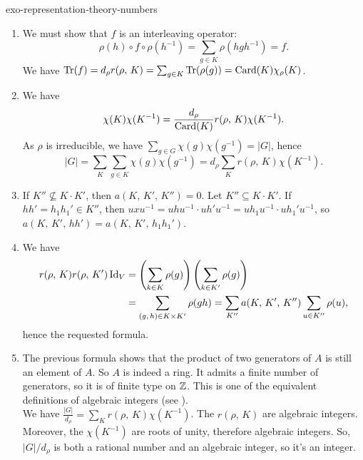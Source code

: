  
\begin{correction}{exo-representation-theory-numbers}
\begin{enumerate}
\item We must show that $ f $ is an interleaving operator:
\begin{equation*}
\rho (h) \circ f \circ \rho (h^{-1}) = \sum_{g \in K}{\rho (hgh^{-1})} = f.
\end{equation*}
We have $ \operatorname{Tr} (f) = d_\rho r (\rho, \, K) = \sum_{g \in K}{\operatorname{Tr} (\rho (g))} = \operatorname{Card} (K) \chi_\rho (K) $.
\item We have
\begin{equation*}
\chi (K) \chi (K^{-1}) = \frac{d_\rho}{\operatorname{Card} (K)} r (\rho, \, K) \chi (K^{-1}).
\end{equation*}
As $ \rho $ is irreducible, we have $ \sum_{g \in G}{\chi (g) \chi (g^{-1})} = |G| $, hence
\begin{equation*}
|G| = \sum_{K}{\sum_{g \in K}{\chi (g) \chi (g^{-1})}} = d_\rho \sum_K{r (\rho, \, K) \chi (K^{-1})}.
\end{equation*}
 
\item If $ K'' \nsubseteq K \cdot K'$, then $ a (K, \, K', \, K'') = 0 $. Let $ K'' \subseteq K \cdot K'$. If $ hh'= h_1 h_1' \in K'' $, then $ uxu^{-1} = uhu^{-1} \cdot uh'u^{-1} = u h_1 u^{-1} \cdot u h_1'u^{-1} $, so $ a (K, \, K', \, h h') = a (K, \, K', \, h_1 h_1') $.
\item We have
\begin{align*}
r (\rho, \, K) r (\rho, \, K') \operatorname{Id}_V & = \left(\sum_{k \in K}{\rho (g)} \right) \left(\sum_{k \in K'}{\rho (g)} \right) \\
& = \sum_{(g, \, h) \in K \times K'}{\rho (gh)} = \sum_{K''}{a (K, \, K', \, K'' ) \sum_{u \in K''}{\rho (u)}},
\end{align*}
hence the requested formula.
\item {}  The previous formula shows that the product of two generators of $ A $ is still an element of $ A $. So $ A $ is indeed a ring. It admits a finite number of generators, so it is of finite type on $ \mathbb{Z} $. This is one of the equivalent definitions of algebraic integers (see \cite{samuel}). \\We have $ \frac{|G|}{d_\rho} = \sum_K{r (\rho, \, K ) \chi (K^{-1})} $. The $ r (\rho, \, K) $ are algebraic integers. Moreover, the $ \chi (K^{-1}) $ are roots of unity, therefore algebraic integers. So, $ |G|/d_\rho $ is both a rational number and an algebraic integer, so it's an integer.
\end{enumerate}
\end{correction}
 
